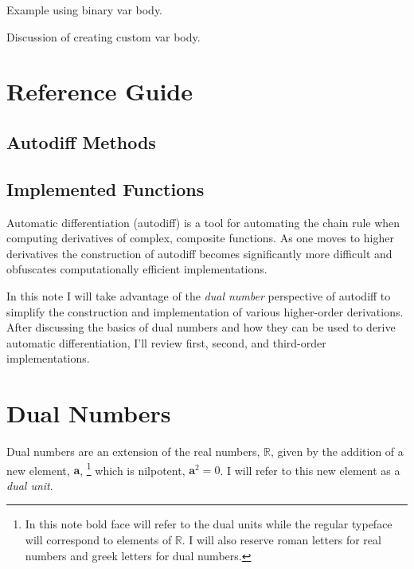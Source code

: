 \documentclass[11pt]{article}
\begin{document}
Example using binary var body.

Discussion of creating custom var body.

\section{Reference Guide}

\subsection{Autodiff Methods}

\subsection{Implemented Functions}

Automatic differentiation (autodiff) is a tool for automating the chain rule when 
computing derivatives of complex, composite functions.  As one moves to higher 
derivatives the construction of autodiff becomes significantly more difficult and 
obfuscates computationally efficient implementations.

In this note I will take advantage of the \textit{dual number} perspective of autodiff
to simplify the construction and implementation of various higher-order derivations.
After discussing the basics of dual numbers and how they can be used to derive
automatic differentiation, I'll review first, second, and third-order implementations.

\section*{Dual Numbers}

Dual numbers are an extension of the real numbers, $\mathbb{R}$, given by the
addition of a new element, $\mathbf{a}$,%
%
\footnote{In this note bold face will refer to the dual units while the regular
typeface will correspond to elements of $\mathbb{R}$.  I will also reserve
roman letters for real numbers and greek letters for dual numbers.}
%
which is nilpotent, $\mathbf{a}^{2} = 0$. I will refer to this new element as a \textit{dual unit}.
\end{document}
